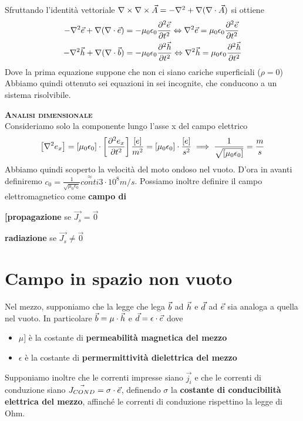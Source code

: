 Sfruttando l'identità vettoriale $\rot\rot\vec{A} = -\nabla^2 + \nabla(\diverg\vec{A})$ si ottiene
\begin{equation}\begin{split}
  -\nabla^2\e + \nabla(\diverg\e) &= - \mu_0\epsilon_0 \deriv[2]{\e}{t} \Leftrightarrow \nabla^2\e = \mu_0\epsilon_0\deriv[2]{\e}{t}\\
  -\nabla^2\h + \nabla(\diverg\b) &= - \mu_0\epsilon_0 \deriv[2]{\h}{t} \Leftrightarrow \nabla^2\h = \mu_0\epsilon_0\deriv[2]{\h}{t}\\
\end{split}\end{equation}
Dove la prima equazione suppone che non ci siano cariche superficiali ($\rho=0$)
Abbiamo quindi ottenuto sei equazioni in sei incognite, che conducono a un sistema risolvibile.

\textbf{\textsc{Analisi dimensionale}}\\
Consideriamo solo la componente lungo l'asse x del campo elettrico
\begin{equation}
  \left[\nabla^2 e_x\right] = \left[\mu_0\epsilon_0\right]  \cdot \left[\deriv[2]{e_x}{t}\right] \\
  \frac{[e]}{m^2} = [\mu_0\epsilon_0] \cdot \frac{[e]}{s^2} \implies \frac{1}{\sqrt{[\mu_0\epsilon_0]}} = \frac{m}{s}
\end{equation}
Abbiamo quindi scoperto la velocità del moto ondoso nel vuoto. D'ora in avanti definiremo
$c_0 = \frac{1}{\sqrt{\mu_0\epsilon_0}}\stackrel{\approx}{conti} 3 \cdot 10^8 m/s$.
Possiamo inoltre definire il campo elettromagnetico come \textbf{campo di}
\begin{description}
  \item \textbf{[propagazione} se $\vec{J_s}=\vec{0}$
  \item \textbf{radiazione} se $\vec{J_s}\neq\vec{0}$
\end{description}

\section{Campo in spazio non vuoto}
Nel mezzo, supponiamo che la legge che lega $\b$ ad $\h$ e $\d$ ad $\e$ sia analoga a quella nel vuoto.
In particolare $\b=\mu\cdot\h$ e $\d=\epsilon\cdot\e$ dove
\begin{itemize}
  \item $\mu ]$ è la costante di \textbf{permeabilità  magnetica del mezzo}
  \item $\epsilon$ è la costante di \textbf{permermittività  dielettrica del mezzo}
\end{itemize}
Supponiamo inoltre che le correnti impresse siano $\vec{j_i}$ e che le correnti di conduzione siano
$\vec{J_{COND}} = \sigma \cdot \e$, definendo $\sigma$ la \textbf{costante di conducibilità elettrica
del mezzo}, affinché le correnti di conduzione rispettino la legge di Ohm.

